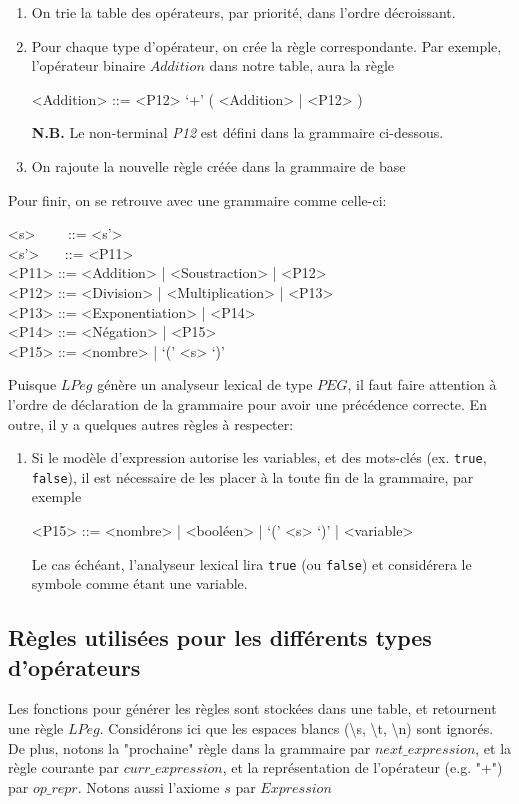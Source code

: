 \documentclass{article}
\begin{document}
\begin{enumerate}
	\item On trie la table des opérateurs, par priorité, dans l'ordre décroissant.
	\item Pour chaque type d'opérateur, on crée la règle correspondante. Par exemple, l'opérateur binaire $Addition$ dans notre table, aura la règle
	\begin{grammar}
		<Addition> ::= <P12> `+' ( <Addition> | <P12> )
	\end{grammar}
	\textbf{N.B.} Le non-terminal \textit{P12} est défini dans la grammaire ci-dessous.
	\item On rajoute la nouvelle règle créée dans la grammaire de base
\end{enumerate}
Pour finir, on se retrouve avec une grammaire comme celle-ci:
\begin{grammar}
<s> \ \ \ \ ::= <s'>\\
<s'> \ \ \ ::= <P11>\\
<P11> ::= <Addition> | <Soustraction> | <P12>\\
<P12> ::= <Division> | <Multiplication> | <P13>\\
<P13> ::= <Exponentiation> | <P14>\\
<P14> ::= <Négation> | <P15>\\
<P15> ::= <nombre> | `(' <s> `)'
\end{grammar}
Puisque $LPeg$ génère un analyseur lexical de type $PEG$, il faut faire attention à l'ordre de déclaration de la grammaire pour avoir une précédence correcte. En outre, il y a quelques autres règles à respecter:
\begin{enumerate}
	\item Si le modèle d'expression autorise les variables, et des mots-clés (ex. \lstinline|true|, \lstinline|false|), il est nécessaire de les placer à la toute fin de la grammaire, par exemple
	\begin{grammar}
<P15> ::= <nombre> | <booléen> | `(' <s> `)' | <variable>
	\end{grammar}
	Le cas échéant, l'analyseur lexical lira \lstinline|true| (ou \lstinline|false|) et considérera le symbole comme étant une variable.
\end{enumerate}

\subsection{Règles utilisées pour les différents types d'opérateurs}
Les fonctions pour générer les règles sont stockées dans une table, et retournent une règle $LPeg$. Considérons ici que les espaces blancs (\textbackslash s, \textbackslash t, \textbackslash n) sont ignorés. De plus, notons la "prochaine" règle dans la grammaire par $next\_expression$, et la règle courante par $curr\_expression$, et la représentation de l'opérateur (e.g. "+") par $op\_repr$. Notons aussi l'axiome $s$ par $Expression$
\end{document}

